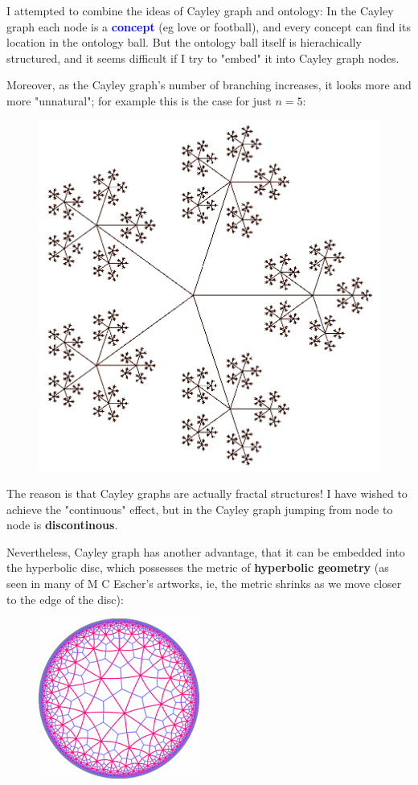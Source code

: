 \documentclass[12pt]{article}
\newcommand{\concept}[1]{\textbf{\textcolor{blue}{#1}}}
\newcommand{\formula}[1]{\textcolor{LogicColor}{#1}}
\begin{document}
I attempted to combine the ideas of Cayley graph and ontology:  In the Cayley graph each node is a \concept{concept} (eg \formula{love} or \formula{football}), and every concept can find its location in the ontology ball.  But the ontology ball itself is hierachically structured, and it seems difficult if I try to "embed" it into Cayley graph nodes.

Moreover, as the Cayley graph's number of branching increases, it looks more and more "unnatural";  for example this is the case for just $n=5$:
\begin{figure}[H]
\centering
\includegraphics[scale=0.25]{cayley-graph-5.png}
\end{figure}
The reason is that Cayley graphs are actually fractal structures!  I have wished to achieve the "continuous" effect, but in the Cayley graph jumping from node to node is \textbf{discontinous}.

Nevertheless, Cayley graph has another advantage, that it can be embedded into the hyperbolic disc, which possesses the metric of \textbf{hyperbolic geometry}  (as seen in many of M C Escher's artworks, ie, the metric shrinks as we move closer to the edge of the disc):
\begin{figure}[H]
\centering
\includegraphics[scale=0.75]{hyperbolic-disc-beautiful.png}
\end{figure}
\end{document}
